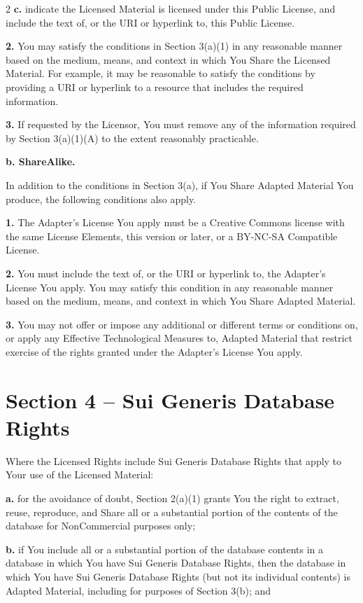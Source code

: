\begin{multicols*}{2}
    \textbf{c.} indicate the Licensed Material is licensed under this Public
    License, and include the text of, or the URI or hyperlink to, this
    Public License.

    \textbf{2.} You may satisfy the conditions in Section 3(a)(1) in any
    reasonable manner based on the medium, means, and context in which You
    Share the Licensed Material. For example, it may be reasonable to
    satisfy the conditions by providing a URI or hyperlink to a resource
    that includes the required information.

    \textbf{3.} If requested by the Licensor, You must remove any of the
    information required by Section 3(a)(1)(A) to the extent reasonably
    practicable.

    \textbf{b. ShareAlike.}

    In addition to the conditions in Section 3(a), if You Share Adapted
    Material You produce, the following conditions also apply.

    \textbf{1.} The Adapter's License You apply must be a Creative Commons
    license with the same License Elements, this version or later, or a
    BY-NC-SA Compatible License.

    \textbf{2.} You must include the text of, or the URI or hyperlink to, the
    Adapter's License You apply. You may satisfy this condition in any
    reasonable manner based on the medium, means, and context in which You
    Share Adapted Material.

    \textbf{3.} You may not offer or impose any additional or different terms or
    conditions on, or apply any Effective Technological Measures to,
    Adapted Material that restrict exercise of the rights granted under the
    Adapter's License You apply.


    \section*{Section 4 -- Sui Generis Database Rights}

    Where the Licensed Rights include Sui Generis Database Rights that
    apply to Your use of the Licensed Material:

    \textbf{a.} for the avoidance of doubt, Section 2(a)(1) grants You the right
    to extract, reuse, reproduce, and Share all or a substantial portion of
    the contents of the database for NonCommercial purposes only;

    \textbf{b.} if You include all or a substantial portion of the database
    contents in a database in which You have Sui Generis Database Rights,
    then the database in which You have Sui Generis Database Rights (but
    not its individual contents) is Adapted Material, including for
    purposes of Section 3(b); and


\end{multicols*}
